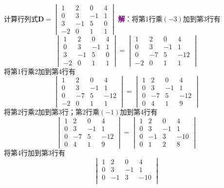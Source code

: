 \begin{example}
	计算行列式$\mathbf{D}=\begin{vmatrix}
		1 & 2 & 0 & 4\\
		0 & 3 & -1 & 1\\
		3 & -1 & 5 & 0\\
		-2 & 0 & 1 & 1
	   \end{vmatrix}$
	\tcblower
	\textcolor{purple}{\textbf{解}}：将第1行乘$(-3)$加到第3行有
	$$\begin{vmatrix}
		1 & 2 & 0 & 4\\
		0 & 3 & -1 & 1\\
		3 & -1 & 5 & 0\\
		-2 & 0 & 1 & 1
	   \end{vmatrix}=\begin{vmatrix}
		1 & 2 & 0 & 4\\
		0 & 3 & -1 & 1\\
		0 & -7 & 5 & -12\\
		-2 & 0 & 1 & 1
	   \end{vmatrix}$$将第1行乘2加到第4行有
	   $$\begin{vmatrix}
		1 & 2 & 0 & 4\\
		0 & 3 & -1 & 1\\
		0 & -7 & 5 & -12\\
		-2 & 0 & 1 & 1
	   \end{vmatrix}=\begin{vmatrix}
		1 & 2 & 0 & 4\\
		0 & 3 & -1 & 1\\
		0 & -7 & 5 & -12\\
		0 & 4 & 1 & 9
	   \end{vmatrix}$$将第2行乘2加到第3行；第2行乘$(-1)$加到第4行有
	   $$\begin{vmatrix}
		1 & 2 & 0 & 4\\
		0 & 3 & -1 & 1\\
		0 & -7 & 5 & -12\\
		0 & 4 & 1 & 9
	   \end{vmatrix}=\begin{vmatrix}
		1 & 2 & 0 & 4\\
		0 & 3 & -1 & 1\\
		0 & -1 & 3 & -10\\
		0 & 1 & 2 & 8
	   \end{vmatrix}$$将第4行加到第3行有
	   $$\begin{vmatrix}
		1 & 2 & 0 & 4\\
		0 & 3 & -1 & 1\\
		0 & -1 & 3 & -10\\

\end{vmatrix}$$
\end{example}
